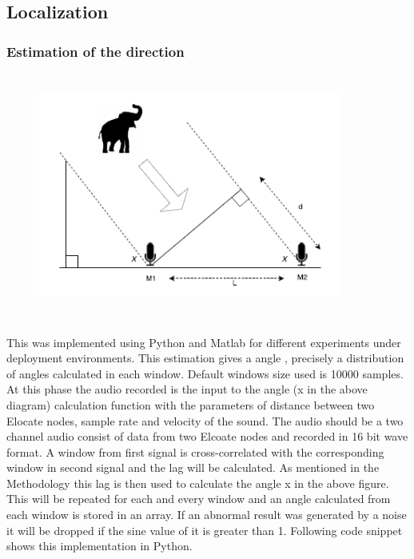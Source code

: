 \documentclass[12pt]{article}
\numberwithin{figure}{section}
\numberwithin{table}{section}
\begin{document}
\subsection{Localization}

\subsubsection{Estimation of the direction}

\begin{figure}[H]
\centering
\includegraphics[width=100mm,height=80mm]{direction.png}
\label{direction1}
\end{figure}
\paragraph{}

This was implemented using Python and Matlab for different experiments under deployment environments. This estimation gives a angle , precisely a distribution of angles calculated in each window. Default windows size used is 10000 samples. At this phase the audio recorded is the input to the angle (x in the above diagram) calculation function with the parameters of distance between two Elocate nodes, sample rate and velocity of the sound. The audio should be a two channel audio consist of data from two Elcoate nodes and recorded in 16 bit wave format. A window from first signal is cross-correlated with the corresponding window in second signal and the lag will be calculated. As mentioned in the Methodology this lag is then used to calculate the angle x in the above figure. This will be repeated for each and every window and an angle calculated from each window is stored in an array. If an abnormal result was generated by a noise it will be dropped if the sine value of it is greater than 1. Following code snippet shows this implementation in Python.
\end{document}
